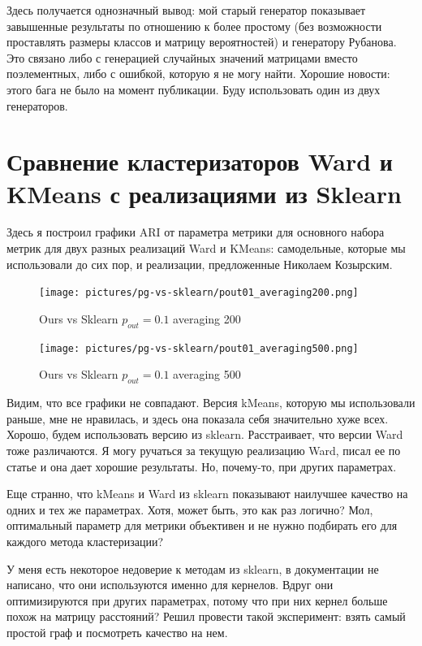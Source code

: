 \documentclass{article}
\begin{document}
Здесь получается однозначный вывод: мой старый генератор показывает завышенные результаты по отношению к более простому (без возможности проставлять размеры классов и матрицу вероятностей) и генератору Рубанова. Это связано либо с генерацией случайных значений матрицами вместо поэлементных, либо с ошибкой, которую я не могу найти. Хорошие новости: этого бага не было на момент публикации. Буду использовать один из двух генераторов.


\section{Сравнение кластеризаторов Ward и KMeans с реализациями из Sklearn}
Здесь я построил графики ARI от параметра метрики для основного набора метрик для двух разных реализаций Ward и KMeans: самодельные, которые мы использовали до сих пор, и реализации, предложенные Николаем Козырским.

\begin{figure}[H]
	\texttt{[image: pictures/pg-vs-sklearn/pout01\_averaging200.png]}
	\caption{\label{f_vs2} Ours vs Sklearn $p_{out}=0.1$ averaging 200}
\end{figure}

\begin{figure}[H]
	\texttt{[image: pictures/pg-vs-sklearn/pout01\_averaging500.png]}
	\caption{\label{f_vs2} Ours vs Sklearn $p_{out}=0.1$ averaging 500}
\end{figure}

Видим, что все графики не совпадают. Версия kMeans, которую мы использовали раньше, мне не нравилась, и здесь она показала себя значительно хуже всех. Хорошо, будем использовать версию из sklearn. Расстраивает, что версии Ward тоже различаются. Я могу ручаться за текущую реализацию Ward, писал ее по статье и она дает хорошие результаты. Но, почему-то, при других параметрах. 

Еще странно, что kMeans и Ward из sklearn показывают наилучшее качество на одних и тех же параметрах. Хотя, может быть, это как раз логично? Мол, оптимальный параметр для метрики объективен и не нужно подбирать его для каждого метода кластеризации?

У меня есть некоторое недоверие к методам из sklearn, в документации не написано, что они используются именно для кернелов. Вдруг они оптимизируются при других параметрах, потому что при них кернел больше похож на матрицу расстояний? Решил провести такой эксперимент: взять самый простой граф и посмотреть качество на нем.
\end{document}
